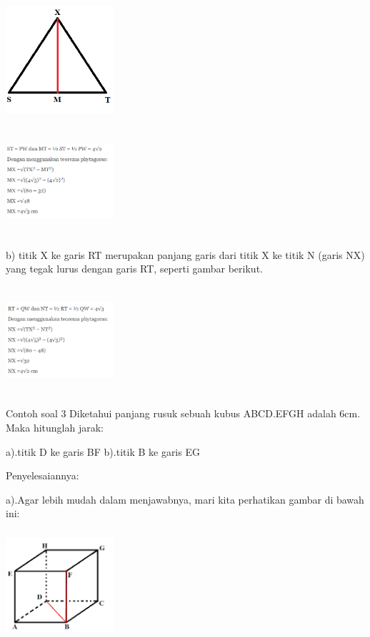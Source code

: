 \documentclass[11pt,fleqn]{book} %
\begin{document}
\includegraphics[width = 4cm, height= 4cm]{Pictures/gi12.png}

\includegraphics[width = 4cm, height= 4cm]{Pictures/gi14.png}

b) titik X ke garis RT merupakan panjang garis dari titik X ke titik N (garis NX) yang tegak lurus dengan garis RT, seperti gambar berikut.

\includegraphics[width = 4cm, height= 4cm]{Pictures/gi15.png}


Contoh soal 3
Diketahui panjang rusuk sebuah kubus ABCD.EFGH adalah 6cm. Maka hitunglah jarak:

a).titik D ke garis BF
b).titik B ke garis EG

Penyelesaiannya:

a).Agar lebih mudah dalam menjawabnya, mari kita perhatikan gambar di bawah ini:

\includegraphics[width = 4cm, height= 4cm]{Pictures/gi16.png}
\end{document}
